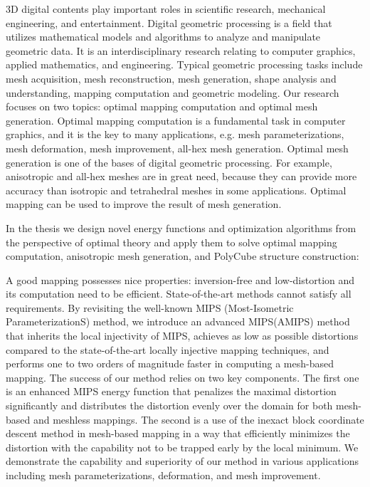 \begin{enabstract}
3D digital contents play important roles in scientific research, mechanical engineering, and entertainment. Digital geometric processing is a field that utilizes mathematical models and algorithms to analyze and manipulate geometric data. It is an interdisciplinary research relating to computer graphics, applied mathematics, and engineering. Typical geometric processing tasks include mesh acquisition, mesh reconstruction, mesh generation, shape analysis and understanding, mapping computation and geometric modeling. Our research focuses on two topics: optimal mapping computation and optimal mesh generation. Optimal mapping computation is a fundamental task in computer graphics, and it is the key to many applications, e.g. mesh parameterizations, mesh deformation, mesh improvement, all-hex mesh generation. Optimal mesh generation is one of the bases of digital geometric processing. For example, anisotropic and all-hex meshes are in great need, because they can provide more accuracy than isotropic and tetrahedral meshes in some applications. Optimal mapping can be used to improve the result of mesh generation.

In the thesis  we design novel energy functions and optimization algorithms from the perspective of optimal theory and apply them to solve optimal mapping computation, anisotropic mesh generation, and PolyCube structure construction:

A good mapping possesses nice properties: inversion-free and low-distortion and its computation need to be efficient. State-of-the-art methods cannot satisfy all requirements. By revisiting the well-known MIPS (Most-Isometric ParameterizationS) method, we introduce an advanced MIPS(AMIPS) method that inherits the local injectivity of MIPS, achieves as low as possible distortions compared to the state-of-the-art locally injective mapping techniques, and performs one to two orders of magnitude faster in computing a mesh-based mapping. The success of our method relies on two key components. The first one is an enhanced MIPS energy function that penalizes the maximal distortion significantly and distributes the distortion evenly over the domain for both mesh-based and meshless mappings. The second is a use of the inexact block coordinate descent method in mesh-based mapping in a way that efficiently minimizes the distortion with the capability not to be trapped early by the local minimum. We demonstrate the capability and superiority of our method in various applications including mesh parameterizations, deformation, and mesh improvement.


\end{enabstract}
